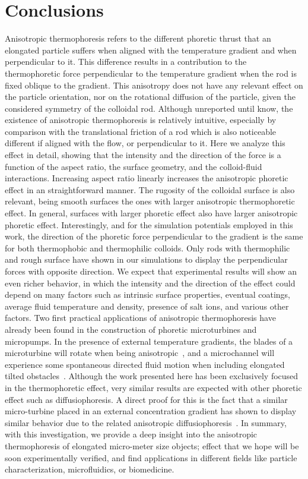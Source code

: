 \documentclass[aps,pre,twocolumn,showpacs,superscriptaddress]{revtex4-1}
\begin{document}
\section{Conclusions}
Anisotropic thermophoresis refers to the different phoretic thrust
that an elongated particle suffers when aligned with the temperature
gradient and when perpendicular to it.  This difference results in a
contribution to the thermophoretic force perpendicular to the
temperature gradient when the rod is fixed oblique to the gradient. %
This anisotropy does not have any relevant effect on the particle
orientation, nor on the rotational diffusion of the particle, given
the considered symmetry of the colloidal rod. %
Although unreported until know, the existence of anisotropic
thermophoresis is relatively intuitive, especially by comparison with
the translational friction of a rod which is also noticeable different
if aligned with the flow, or perpendicular to it.  %
Here we analyze this effect in detail, showing that the intensity and
the direction of the force is a function of the aspect ratio, the
surface geometry, and the colloid-fluid interactions. Increasing
aspect ratio linearly increases the anisotropic phoretic effect in an
straightforward manner. The rugosity of the colloidal surface is also
relevant, being smooth surfaces the ones with larger anisotropic
thermophoretic effect. In general, surfaces with larger phoretic
effect also have larger anisotropic phoretic effect. Interestingly,
and for the simulation potentials employed in this work, the direction
of the phoretic force perpendicular to the gradient is the same for
both thermophobic and thermophilic colloids.  Only rods with
thermophilic and rough surface have shown in our simulations to
display the perpendicular forces with opposite direction. We expect
that experimental results will show an even richer behavior, in which
the intensity and the direction of the effect could depend on many
factors such as intrinsic surface properties, eventual coatings,
average fluid temperature and density, presence of salt ions, and
various other factors. %
Two first practical applications of anisotropic thermophoresis have
already been found in the construction of phoretic microturbines and
micropumps. In the presence of external temperature gradients, the
blades of a microturbine will rotate when being
anisotropic~\cite{yang14turb}, and a microchannel will experience some
spontaneous directed fluid motion when including elongated tilted
obstacles~\cite{tan2}. %
Although the work presented here has been exclusively focused in the
thermophoretic effect, very similar results are expected with other
phoretic effect such as diffusiophoresis. A direct proof for this is
the fact that a similar micro-turbine placed in an external
concentration gradient has shown to display similar behavior due to
the related anisotropic diffusiophoresis~\cite{yang15cturb}. %
In summary, with this investigation, we provide a deep insight into
the anisotropic thermophoresis of elongated micro-meter size objects;
effect that we hope will be soon experimentally verified, and find
applications in different fields like particle characterization,
microfluidics, or biomedicine.
\end{document}
